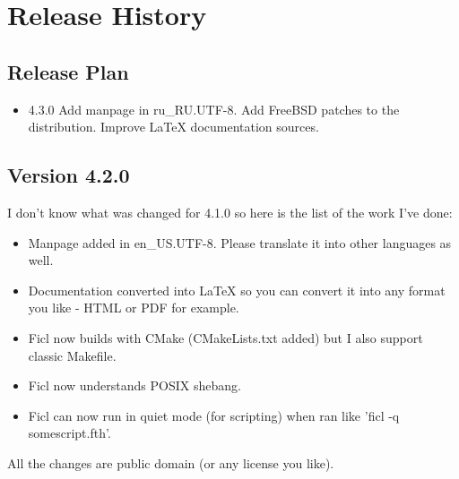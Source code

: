 \chapter{Release History}
\section{Release Plan}
\begin{itemize}[noitemsep]
	\item 4.3.0
		\subitem Add manpage in ru\_RU.UTF-8.
		\subitem Add FreeBSD patches to the distribution.
		\subitem Improve LaTeX documentation sources.
\end{itemize}


\section{Version 4.2.0}
I don't know what was changed for 4.1.0 so here is the list of the
work I've done:
\begin{itemize}[noitemsep]
	\item Manpage added in en\_US.UTF-8. Please translate it into
		other languages as well.
	\item Documentation converted into LaTeX so you can convert it
		into any format you like - HTML or PDF for example.
	\item Ficl now builds with CMake (CMakeLists.txt added) but
		I also support classic Makefile.
	\item Ficl now understands POSIX shebang.
	\item Ficl can now run in quiet mode (for scripting) when
		ran like 'ficl -q somescript.fth'.
\end{itemize}
All the changes are public domain (or any license you like).


